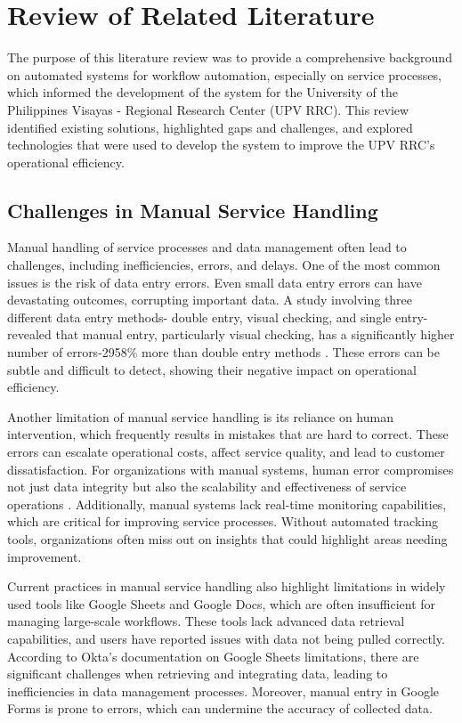 \chapter{Review of Related Literature}
\label{sec:relatedlit}

The purpose of this literature review was to provide a comprehensive background on automated systems for workflow automation, especially on service processes, which informed the development of the system for the University of the Philippines Visayas - Regional Research Center (UPV RRC). This review identified existing solutions, highlighted gaps and challenges, and explored technologies that were used to develop the system to improve the UPV RRC’s operational efficiency.

\section{Challenges in Manual Service Handling}

Manual handling of service processes and data management often lead to challenges, including inefficiencies, errors, and delays. One of the most common issues is the risk of data entry errors. Even small data entry errors can have devastating outcomes, corrupting important data. A study involving three different data entry methods- double entry, visual checking, and single entry- revealed that manual entry, particularly visual checking, has a significantly higher number of errors-2958\% more than double entry methods \cite{barchard2011}. These errors can be subtle and difficult to detect, showing their negative impact on operational efficiency. 

Another limitation of manual service handling is its reliance on human intervention, which frequently results in mistakes that are hard to correct. These errors can escalate operational costs, affect service quality, and lead to customer dissatisfaction. For organizations with manual systems, human error compromises not just data integrity but also the scalability and effectiveness of service operations \cite{bitcat2023}. Additionally, manual systems lack real-time monitoring capabilities, which are critical for improving service processes. Without automated tracking tools, organizations often miss out on insights that could highlight areas needing improvement.

Current practices in manual service handling also highlight limitations in widely used tools like Google Sheets and Google Docs, which are often insufficient for managing large-scale workflows. These tools lack advanced data retrieval capabilities, and users have reported issues with data not being pulled correctly. According to Okta’s documentation on Google Sheets limitations, there are significant challenges when retrieving and integrating data, leading to inefficiencies in data management processes. Moreover, manual entry in Google Forms is prone to errors, which can undermine the accuracy of collected data.

